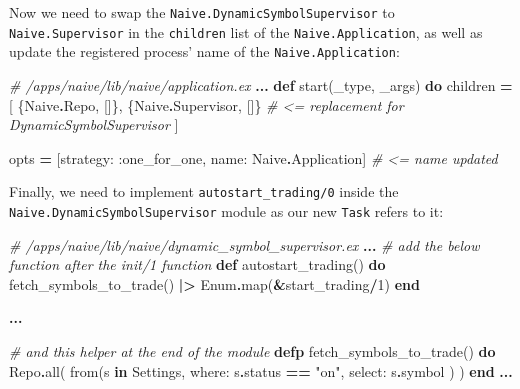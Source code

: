\documentclass[
]{book}
\newenvironment{Shaded}{\begin{snugshade}}{\end{snugshade}}
\newcommand{\CommentTok}[1]{\textcolor[rgb]{0.56,0.35,0.01}{\textit{#1}}}
\newcommand{\ConstantTok}[1]{\textcolor[rgb]{0.00,0.00,0.00}{#1}}
\newcommand{\DecValTok}[1]{\textcolor[rgb]{0.00,0.00,0.81}{#1}}
\newcommand{\KeywordTok}[1]{\textcolor[rgb]{0.13,0.29,0.53}{\textbf{#1}}}
\newcommand{\NormalTok}[1]{#1}
\newcommand{\OperatorTok}[1]{\textcolor[rgb]{0.81,0.36,0.00}{\textbf{#1}}}
\newcommand{\StringTok}[1]{\textcolor[rgb]{0.31,0.60,0.02}{#1}}
\newcommand{\VariableTok}[1]{\textcolor[rgb]{0.00,0.00,0.00}{#1}}
\begin{document}
Now we need to swap the \texttt{Naive.DynamicSymbolSupervisor} to \texttt{Naive.Supervisor} in the \texttt{children} list of the \texttt{Naive.Application}, as well as update the registered process' name of the \texttt{Naive.Application}:

\begin{Shaded}
\begin{Highlighting}[]
\CommentTok{\# /apps/naive/lib/naive/application.ex}
  \OperatorTok{...}
  \KeywordTok{def}\NormalTok{ start(\_type, \_args) }\KeywordTok{do}
\NormalTok{    children }\OperatorTok{=}\NormalTok{ [}
\NormalTok{      \{}\ConstantTok{Naive}\OperatorTok{.}\ConstantTok{Repo}\NormalTok{, []\},}
\NormalTok{      \{}\ConstantTok{Naive}\OperatorTok{.}\ConstantTok{Supervisor}\NormalTok{, []\} }\CommentTok{\# \textless{}= replacement for DynamicSymbolSupervisor}
\NormalTok{    ]}

\NormalTok{    opts }\OperatorTok{=}\NormalTok{ [}\VariableTok{strategy:} \VariableTok{:one\_for\_one}\NormalTok{, }\VariableTok{name:} \ConstantTok{Naive}\OperatorTok{.}\ConstantTok{Application}\NormalTok{] }\CommentTok{\# \textless{}= name updated}
\end{Highlighting}
\end{Shaded}

Finally, we need to implement \texttt{autostart\_trading/0} inside the \texttt{Naive.DynamicSymbolSupervisor} module as our new \texttt{Task} refers to it:

\begin{Shaded}
\begin{Highlighting}[]
\CommentTok{\# /apps/naive/lib/naive/dynamic\_symbol\_supervisor.ex}
  \OperatorTok{...}
  \CommentTok{\# add the below function after the \textasciigrave{}init/1\textasciigrave{} function}
  \KeywordTok{def}\NormalTok{ autostart\_trading() }\KeywordTok{do}
\NormalTok{    fetch\_symbols\_to\_trade()}
    \OperatorTok{|\textgreater{}} \ConstantTok{Enum}\OperatorTok{.}\NormalTok{map(}\OperatorTok{\&}\NormalTok{start\_trading}\OperatorTok{/}\DecValTok{1}\NormalTok{)}
  \KeywordTok{end}
 
  \OperatorTok{...}

  \CommentTok{\# and this helper at the end of the module}
  \KeywordTok{defp}\NormalTok{ fetch\_symbols\_to\_trade() }\KeywordTok{do}
    \ConstantTok{Repo}\OperatorTok{.}\NormalTok{all(}
\NormalTok{      from(s }\KeywordTok{in} \ConstantTok{Settings}\NormalTok{,}
        \VariableTok{where:}\NormalTok{ s}\OperatorTok{.}\NormalTok{status }\OperatorTok{==} \StringTok{"on"}\NormalTok{,}
        \VariableTok{select:}\NormalTok{ s}\OperatorTok{.}\NormalTok{symbol}
\NormalTok{      )}
\NormalTok{    )}
  \KeywordTok{end}
  \OperatorTok{...}
\end{Highlighting}
\end{Shaded}
\end{document}
